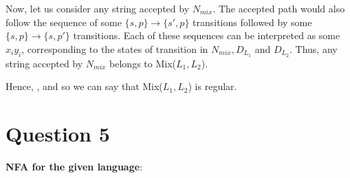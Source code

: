 \documentclass[12pt,a4paper]{article}
\begin{document}
Now, let us consider any string accepted by $N_{mix}$. The accepted path would also follow the sequence of some $\{s,p\} \rightarrow \{s',p\}$ transitions followed by some $\{s,p\} \rightarrow \{s,p'\}$ transitions. Each of these sequences can be interpreted as some $x_iy_i$, corresponding to the states of transition in $N_{mix}, D_{L_1} $ and $D_{L_2}$. Thus, any string accepted by $N_{mix}$ belongs to Mix($L_{1},L_{2}$).

Hence, \textbf{}, and so we can say that Mix($L_{1},L_{2}$) is regular.

\section{Question 5}

\textbf{NFA for the given language}:
\end{document}

